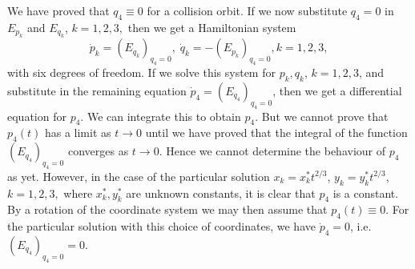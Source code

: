 We have proved that $q_4 \equiv 0$ for a collision orbit. If  we now
substitute $q_4 = 0$ in $E_{p_k}$ and $E_{q_k}$, $k =1,2,3,$ then we
get a Hamiltonian system 
$$
\dot{p}_k = (E_{q_k})_{q_4 = 0}, \; \dot{q}_k = - (E_{p_k})_{q_4 = 0}, k = 1,2,3,
$$
with six degrees of freedom. If we solve this system for $p_k, q_k$,
$k=1,2,3$, and substitute in the remaining equation $\dot{p}_4 =
(E_{q_4})_{q_4 = 0}$, then we get a differential equation for
$p_4$. We can integrate this to obtain $p_4$. But we cannot prove that
$p_4(t)$ has a limit as $t \to 0$ until we have proved that the
integral of the function $(E_{q_4})_{q_4 = 0}$ converges as $t \to
0$. Hence we cannot determine the behaviour of $p_4$ as yet. However,
in the case of the particular solution $x_k = x^*_k t^{2/3}$, $y_k =
y^*_k t^{2/3}$, $k =1,2,3,$ where $x^*_k, y^*_k$ are unknown
constants, it is clear that $p_4$ is a constant. By a rotation of the
coordinate system we may then assume that $p_4(t) \equiv 0$. For the
particular solution with this choice of coordinates, we have
$\dot{p}_4 = 0$, i.e. $(E_{q_4})_{q_4 = 0} = 0$. 

